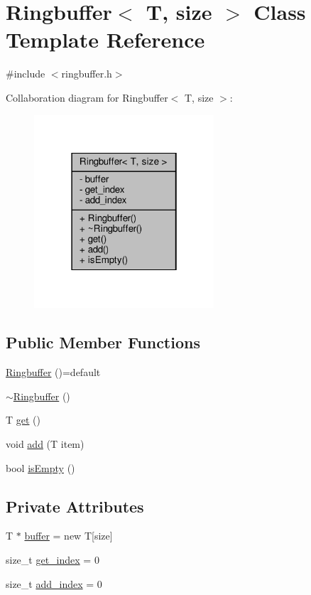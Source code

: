 \hypertarget{classRingbuffer}{}\section{Ringbuffer$<$ T, size $>$ Class Template Reference}
\label{classRingbuffer}


{\ttfamily \#include $<$ringbuffer.\+h$>$}



Collaboration diagram for Ringbuffer$<$ T, size $>$\+:
\nopagebreak
\begin{figure}[H]
\begin{center}
\leavevmode
\includegraphics[width=190pt]{classRingbuffer__coll__graph}
\end{center}
\end{figure}
\subsection*{Public Member Functions}
\begin{DoxyCompactItemize}
\item 
\hyperlink{classRingbuffer_a8c05646994076508b9969a06cee6426a}{Ringbuffer} ()=default
\item 
\hyperlink{classRingbuffer_a67242601a0f115e26f221ea2e9ab77e7}{$\sim$\+Ringbuffer} ()
\item 
T \hyperlink{classRingbuffer_a21f95bebbc300f7b7287284ff5a9ea86}{get} ()
\item 
void \hyperlink{classRingbuffer_a88b2aac3e48efb366d16a10746da3420}{add} (T item)
\item 
bool \hyperlink{classRingbuffer_a2ebb965f90ff6a14f184619ef3dfeca6}{is\+Empty} ()
\end{DoxyCompactItemize}
\subsection*{Private Attributes}
\begin{DoxyCompactItemize}
\item 
T $\ast$ \hyperlink{classRingbuffer_a335ecc63190c7e834e1ef5c694c0513a}{buffer} = new T\mbox{[}size\mbox{]}
\item 
size\+\_\+t \hyperlink{classRingbuffer_a36eb74b7c7e5aa2f5804f9565b247306}{get\+\_\+index} = 0
\item 
size\+\_\+t \hyperlink{classRingbuffer_ad4ddec2757f8c74de1107f96a5b99205}{add\+\_\+index} = 0
\end{DoxyCompactItemize}


